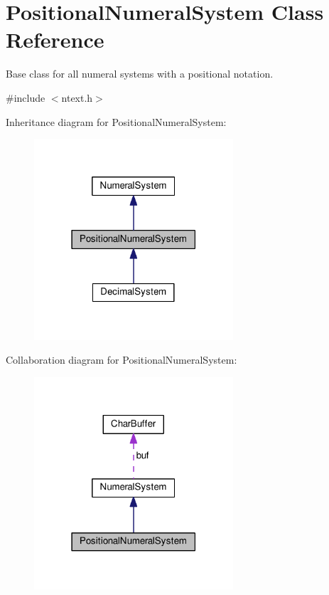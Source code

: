 \hypertarget{classPositionalNumeralSystem}{}\section{Positional\+Numeral\+System Class Reference}
\label{classPositionalNumeralSystem}


Base class for all numeral systems with a positional notation.  




{\ttfamily \#include $<$ntext.\+h$>$}



Inheritance diagram for Positional\+Numeral\+System\+:
\nopagebreak
\begin{figure}[H]
\begin{center}
\leavevmode
\includegraphics[width=210pt]{d4/d57/classPositionalNumeralSystem__inherit__graph}
\end{center}
\end{figure}


Collaboration diagram for Positional\+Numeral\+System\+:
\nopagebreak
\begin{figure}[H]
\begin{center}
\leavevmode
\includegraphics[width=210pt]{db/dd6/classPositionalNumeralSystem__coll__graph}
\end{center}
\end{figure}
